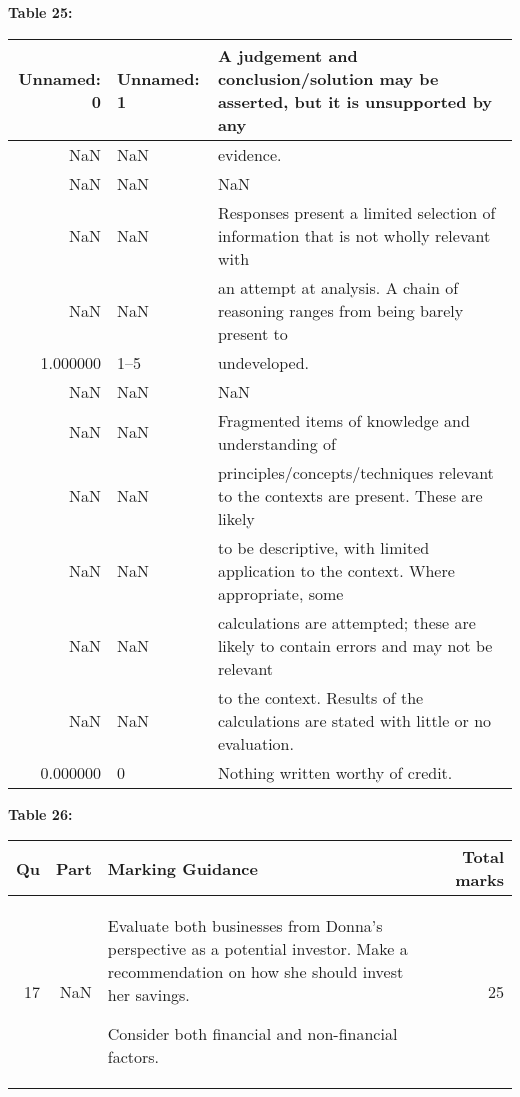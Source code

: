 \documentclass{article}
\begin{document}
\textbf{Table 25:}
\begin{tabular}{rll}
\toprule
Unnamed: 0 & Unnamed: 1 & A judgement and conclusion/solution may be asserted, but it is unsupported by any \\
\midrule
NaN & NaN & evidence. \\
NaN & NaN & NaN \\
NaN & NaN & Responses present a limited selection of information that is not wholly relevant with \\
NaN & NaN & an attempt at analysis.  A chain of reasoning ranges from being barely present to \\
1.000000 & 1–5 & undeveloped. \\
NaN & NaN & NaN \\
NaN & NaN & Fragmented items of knowledge and understanding of \\
NaN & NaN & principles/concepts/techniques relevant to the contexts are present.  These are likely \\
NaN & NaN & to be descriptive, with limited application to the context.  Where appropriate, some \\
NaN & NaN & calculations are attempted; these are likely to contain errors and may not be relevant \\
NaN & NaN & to the context.  Results of the calculations are stated with little or no evaluation. \\
0.000000 & 0 & Nothing written worthy of credit. \\
\bottomrule
\end{tabular}

\textbf{Table 26:}
\begin{tabular}{rrlr}
\toprule
Qu & Part & Marking Guidance & Total
marks \\
\midrule
17 & NaN & Evaluate both businesses from Donna’s perspective as a potential investor.
Make a recommendation on how she should invest her savings.

Consider both financial and non-financial factors. & 25 \\
\bottomrule
\end{tabular}
\end{document}
